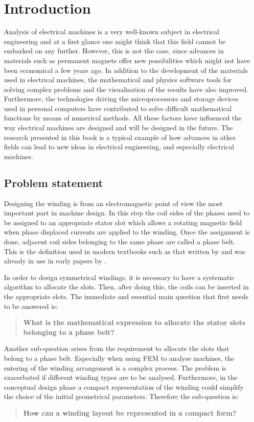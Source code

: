 \chapter{Introduction}
Analysis of electrical machines is a very well-known subject in electrical engineering and at a first glance one might think that this field cannot be embarked on any further. However, this is not the case, since advances in materials such as permanent magnets offer new possibilities which might not have been economical a few years ago. In addition to the development of the materials used in electrical machines, the mathematical and physics software tools for solving complex problems and the visualisation of the results have also improved. Furthermore, the technologies driving the microprocessors and storage devices used in personal computers have contributed to solve difficult mathematical functions by means of numerical methods. All these factors have influenced the way electrical machines are designed and will be designed in the future. The research presented in this book is a typical example of how advances in other fields can lead to new ideas in electrical engineering, and especially electrical machines. 


\section{Problem statement}
\label{sec:problem_statement}
Designing the winding is from an electromagnetic point of view the most important part in machine design. In this step the coil sides of the phases need to be assigned to an appropriate stator slot which allows a rotating magnetic field when phase displaced currents are applied to the winding. Once the assignment is done, adjacent coil sides belonging to the same phase are called a phase belt. This is the definition used in modern textbooks such as that written by \cite{REF-00330} and was already in use in early papers by \cite{REF-00835}.

In order to design symmetrical windings, it is necessary to have a systematic algorithm to allocate the slots. Then, after doing this, the coils can be inserted in the appropriate slots. The immediate and essential main question that first needs to be answered is: 
\begin{quote}
\textbf{What is the mathematical expression to allocate the stator slots belonging to a phase belt?} 
\end{quote}

Another sub-question arises from the requirement to allocate the slots that belong to a phase belt. Especially when using FEM to analyse machines, the entering of the winding arrangement is a complex process. The problem is exacerbated if different winding types are to be analysed. Furthermore, in the conceptual design phase a compact representation of the winding could simplify the choice of the initial geometrical parameters. Therefore the sub-question is: 
\begin{quote}
\textbf{How can a winding layout be represented in a compact form?} 
\end{quote}

